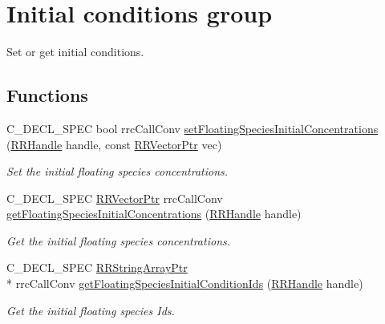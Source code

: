 \hypertarget{group__initial_conditions}{\section{Initial conditions group}
\label{group__initial_conditions}
}


Set or get initial conditions.  


\subsection*{Functions}
\begin{DoxyCompactItemize}
\item 
C\-\_\-\-D\-E\-C\-L\-\_\-\-S\-P\-E\-C bool rrc\-Call\-Conv \hyperlink{group__initial_conditions_ga669ae93bd60148aaf48f7105748a551e}{set\-Floating\-Species\-Initial\-Concentrations} (\hyperlink{rrc__types_8h_a1d68f0592372208fa5a5f2799ea4b3ae}{R\-R\-Handle} handle, const \hyperlink{rrc__types_8h_a3be72d6006034fd349f753d2bf441bf7}{R\-R\-Vector\-Ptr} vec)
\begin{DoxyCompactList}\small\item\em Set the initial floating species concentrations. \end{DoxyCompactList}\item 
C\-\_\-\-D\-E\-C\-L\-\_\-\-S\-P\-E\-C \hyperlink{rrc__types_8h_a3be72d6006034fd349f753d2bf441bf7}{R\-R\-Vector\-Ptr} rrc\-Call\-Conv \hyperlink{group__initial_conditions_ga69c0a516f028a0608d8b9167ff56111f}{get\-Floating\-Species\-Initial\-Concentrations} (\hyperlink{rrc__types_8h_a1d68f0592372208fa5a5f2799ea4b3ae}{R\-R\-Handle} handle)
\begin{DoxyCompactList}\small\item\em Get the initial floating species concentrations. \end{DoxyCompactList}\item 
C\-\_\-\-D\-E\-C\-L\-\_\-\-S\-P\-E\-C \hyperlink{rrc__types_8h_a7c9475df6c7337d99482b13a365e7596}{R\-R\-String\-Array\-Ptr} \\*
rrc\-Call\-Conv \hyperlink{group__initial_conditions_ga1e19db0cfd663b9648f59191afdc64c6}{get\-Floating\-Species\-Initial\-Condition\-Ids} (\hyperlink{rrc__types_8h_a1d68f0592372208fa5a5f2799ea4b3ae}{R\-R\-Handle} handle)
\begin{DoxyCompactList}\small\item\em Get the initial floating species Ids. \end{DoxyCompactList}\end{DoxyCompactItemize}


